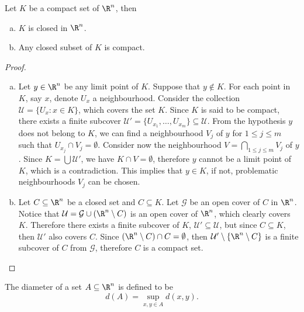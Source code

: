 \begin{proposition}\label{prop: compact-close}
Let \(K\) be a compact set of \(\R^n\), then
\begin{enumerate}[(a)]
\item \(K\) is closed in \(\R^n\).
\item Any closed subset of \(K\) is compact.
\end{enumerate}
\end{proposition}

\begin{proof}
\begin{enumerate}[(a)]
\item Let \(y \in \R^n\) be any limit point of \(K\). Suppose that \(y
    \not\in K\). For each point in \(K\), say \(x\), denote \(U_x\) a
    neighbourhood. Consider the collection \(\mathcal U = \{U_x \colon x \in K\}\),
    which covers the set \(K\). Since \(K\) is said to be compact, there
    exists a finite subcover \(\mathcal U' = \{U_{x_1}, \dots, U_{x_m}\}
    \subseteq \mathcal U\). From the hypothesis \(y\) does not belong to
    \(K\), we can find a neighbourhood \(V_j\) of \(y\) for \(1 \leq j \leq
    m\) such that \(U_{x_j} \cap V_j = \emptyset\). Consider now the
    neighbourhood \(V = \bigcap_{1 \leq j \leq m} V_j\) of \(y\). Since \(K =
    \bigcup \mathcal U'\), we have \(K \cap V = \emptyset\), therefore \(y\)
    cannot be a limit point of \(K\), which is a contradiction. This implies
    that \(y \in K\), if not, problematic neighbourhoods \(V_j\) can be
    chosen.
\item Let \(C \subseteq \R^n\) be a closed set and \(C \subseteq K\). Let
    \(\mathcal G\) be an open cover of \(C\) in \(\R^n\). Notice that
    \(\mathcal U = \mathcal G \cup (\R^n \setminus C)\) is an open cover of
    \(\R^n\), which clearly covers \(K\). Therefore there exists a finite
    subcover of \(K\), \(\mathcal U' \subseteq \mathcal U\), but since \(C
    \subseteq K\), then \(\mathcal U'\) also covers \(C\). Since \((\R^n
    \setminus C) \cap C = \emptyset\), then \(\mathcal U' \setminus \{\R^n
    \setminus C\}\) is a finite subcover of \(C\) from \(\mathcal G\),
    therefore \(C\) is a compact set.
\end{enumerate}
\end{proof}

\begin{definition}\label{def:Rn-diameter}
The diameter of a set \(A \subseteq \R^n\) is defined to be
\[
d(A) = \sup_{x, y \in A} d(x, y).
\]
\end{definition}

